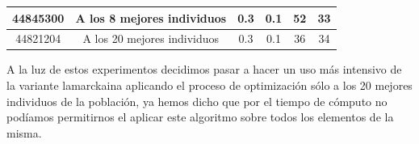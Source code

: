 \documentclass[10pt,a4paper]{article}
\begin{document}
\begin{center}
\begin{table}[H]
\begin{tabular}{|l|c|c|c|c|c|}
\multicolumn{1}{|c|}{44845300} & A los 8 mejores individuos  & 0.3                                                            & 0.1                                                               & 52                                                                          & 33                                                                                  \\ \hline
\multicolumn{1}{|c|}{44821204} & A los 20 mejores individuos & 0.3                                                            & 0.1                                                               & 36                                                                          & 34                                                                                  \\ \hline
\end{tabular}
\end{table}
\end{center}

A la luz de estos experimentos decidimos pasar a hacer un uso más intensivo de la variante lamarckaina aplicando el proceso de optimización sólo a los 20 mejores individuos de la población, ya hemos dicho que por el tiempo de cómputo no podíamos permitirnos el aplicar este algoritmo sobre todos los elementos de la misma.
\end{document}
